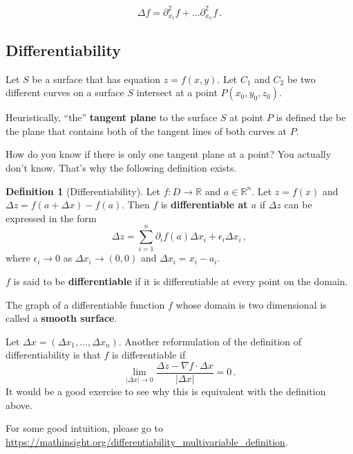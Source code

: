 \documentclass[
]{article}
\theoremstyle{definition}
\newtheorem{definition}{Definition}[section]
\theoremstyle{definition}
\theoremstyle{definition}
\theoremstyle{definition}
\theoremstyle{remark}
\begin{document}
\begin{equation*}
    \Delta f = \partial_{x_1}^2 f + \dots \partial_{x_n}^2 f \,.
\end{equation*}

\hypertarget{differentiability}{%
\subsection{Differentiability}\label{differentiability}}

Let \(S\) be a surface that has equation \(z = f(x,y)\).
Let \(C_1\) and \(C_2\) be two different curves on a surface \(S\)
intersect at a point \(P(x_0, y_0, z_0)\).

Heuristically, ``the'' \textbf{tangent plane} to the surface \(S\) at point \(P\) is defined the be the plane that contains
both of the tangent lines of both curves at \(P\).

How do you know if there is only one tangent plane at a point?
You actually don't know.
That's why the following definition exists.

\begin{definition}[Differentiability]
Let \(f:D \to \mathbb{R}\) and \(a\in \mathbb{R}^n\).
Let \(z = f(x)\) and \(\Delta z = f(a + \Delta x ) - f(a)\).
Then \(f\) is \textbf{differentiable at \(a\)} if \(\Delta z\) can be
expressed in the form
\begin{equation*}
    \Delta z = \sum_{i=1}^n \partial_i f(a) \Delta x_i +  \epsilon_i \Delta x_i  \,,
\end{equation*}
where \(\epsilon_i \to 0\) as \(\Delta x_i \to (0,0)\) and
\(\Delta x_i = x_i - a_i\).

\(f\) is said to be \textbf{differentiable} if it is differentiable at every point on the domain.
\end{definition}

The graph of a differentiable function \(f\) whose
domain is two dimensional is called a \textbf{smooth surface}.

Let \(\Delta x = (\Delta x_1, \dots, \Delta x_n)\).
Another reformulation of the definition of differentiability is that \(f\) is
differentiable if
\begin{equation*}
\lim_{|\Delta x| \to 0}
    \frac{\Delta z - \nabla f \cdot \Delta x }{| \Delta x|}  = 0 \,.
\end{equation*}
It would be a good exercise to see why this is equivalent with the definition above.

For some good intuition, please go to \url{https://mathinsight.org/differentiability_multivariable_definition}.
\end{document}

